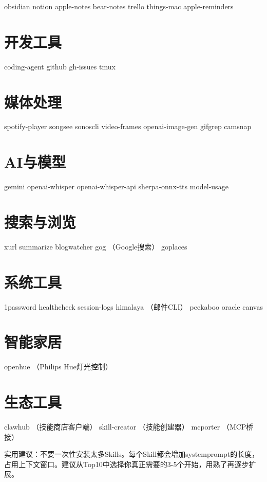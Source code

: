 \documentclass[
  10
]{article}
\begin{document}
obsidian notion apple-notes bear-notes trello things-mac apple-reminders

\section{开发工具}\label{ux5f00ux53d1ux5de5ux5177}

coding-agent github gh-issues tmux

\section{媒体处理}\label{ux5a92ux4f53ux5904ux7406}

spotify-player songsee sonoscli video-frames openai-image-gen gifgrep
camsnap

\section{AI与模型}\label{aiux4e0eux6a21ux578b}

gemini openai-whisper openai-whisper-api sherpa-onnx-tts model-usage

\section{搜索与浏览}\label{ux641cux7d22ux4e0eux6d4fux89c8}

xurl summarize blogwatcher gog （Google搜索） goplaces

\section{系统工具}\label{ux7cfbux7edfux5de5ux5177}

1password healthcheck session-logs himalaya （邮件CLI） peekaboo oracle
canvas

\section{智能家居}\label{ux667aux80fdux5bb6ux5c45}

openhue （Philips Hue灯光控制）

\section{生态工具}\label{ux751fux6001ux5de5ux5177}

clawhub （技能商店客户端） skill-creator （技能创建器） mcporter
（MCP桥接）

实用建议：不要一次性安装太多Skills。每个Skill都会增加systemprompt的长度，占用上下文窗口。建议从Top10中选择你真正需要的3-5个开始，用熟了再逐步扩展。
\end{document}
